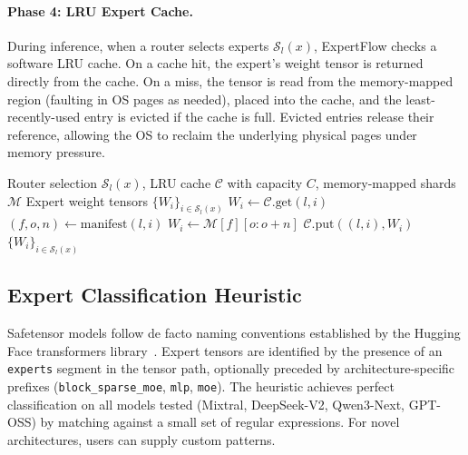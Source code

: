 \documentclass[11pt,a4paper]{article}
\begin{document}
\paragraph{Phase 4: LRU Expert Cache.}
During inference, when a router selects experts $\mathcal{S}_l(x)$, ExpertFlow
checks a software LRU cache. On a cache hit, the expert's weight tensor
is returned directly from the cache. On a miss, the tensor is read from the
memory-mapped region (faulting in OS pages as needed), placed into the cache,
and the least-recently-used entry is evicted if the cache is full. Evicted
entries release their reference, allowing the OS to reclaim the underlying
physical pages under memory pressure.

\begin{algorithm}[t]
\caption{ExpertFlow Expert Retrieval}
\label{alg:expertflow}
\begin{algorithmic}[1]
\REQUIRE Router selection $\mathcal{S}_l(x)$, LRU cache $\mathcal{C}$
  with capacity $C$, memory-mapped shards $\mathcal{M}$
\ENSURE Expert weight tensors $\{W_i\}_{i \in \mathcal{S}_l(x)}$
    \STATE $W_i \gets \mathcal{C}.\text{get}(l, i)$ 
  \ELSE
    \STATE $(f, o, n) \gets \text{manifest}(l, i)$
    \STATE $W_i \gets \mathcal{M}[f][o : o+n]$
    \STATE $\mathcal{C}.\text{put}((l, i), W_i)$
  \ENDIF
\ENDFOR
\RETURN $\{W_i\}_{i \in \mathcal{S}_l(x)}$
\end{algorithmic}
\end{algorithm}

\subsection{Expert Classification Heuristic}
\label{sec:method:heuristic}

Safetensor models follow de facto naming conventions established by the
Hugging Face transformers library~\citep{wolf2020transformers}. Expert tensors
are identified by the presence of an \texttt{experts} segment in the tensor
path, optionally preceded by architecture-specific prefixes
(\texttt{block\_sparse\_moe}, \texttt{mlp}, \texttt{moe}). The heuristic
achieves perfect classification on all models tested (Mixtral, DeepSeek-V2,
Qwen3-Next, GPT-OSS) by matching against a small set of regular expressions.
For novel architectures, users can supply custom patterns.
\end{document}
